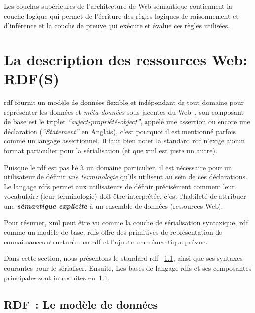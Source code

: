 Les couches supérieures de l'architecture de Web sémantique
contiennent la couche logique qui permet de l'écriture des règles
logiques de raisonnement et d'inférence et la couche de preuve qui
exécute et évalue ces règles utilisées.


\section{La description des ressources Web: RDF(S)}
\label{sec:semantic-web-rdf}

\acrshort{rdf} fournit un modèle de données flexible et indépendant de
tout domaine pour représenter les données et \emph{méta-données}
sous-jacentes du Web~\cite{decker2000semantic}, son composant de base
est le triplet \emph{``suject-propriété-object''}, appelé une assertion
ou encore une déclaration (\emph{``Statement''} en Anglais), c'est
pourquoi il est mentionné parfois comme un langage assertionnel. Il
faut bien noter la standard \acrshort{rdf} n'exige aucun format
particulier pour la sérialisation (et que \acrshort{xml} est juste un
autre).\medskip


\newpage
Puisque le \acrshort{rdf} est pas lié à un domaine particulier, il est
nécessaire pour un utilisateur de définir \emph{une terminologie}
qu'ils utilisent au sein de ces déclarations. Le langage
\acrshort{rdfs} permet aux utilisateurs de définir précisément comment
leur vocabulaire (leur terminologie) doit être interprétée, c'est
l'habileté de attribuer une \emph{\textbf{sémantique explicite}} à un
ensemble de données (ressources Web).\medskip

Pour résumer, \acrshort{xml} peut être vu comme la couche de
sérialisation syntaxique, \acrshort{rdf} comme un modèle de
base. \acrshort{rdfs} offre des primitives de représentation de
connaissances structurées en \acrshort{rdf} et l'ajoute une sémantique
prévue.\medskip

Dans cette section, nous présentons le standard \acrshort{rdf}
~\ref{sec:semantic-web-rdf-rdf}, ainsi que ses syntaxes courantes pour
le sérialiser. Ensuite, Les bases de langage \acrshort{rdfs} et ses
composantes principales sont introduites
en~\ref{sec:semantic-web-rdf-rdf}.\medskip

\subsection{RDF~: Le modèle de données}
\label{sec:semantic-web-rdf-rdf}

